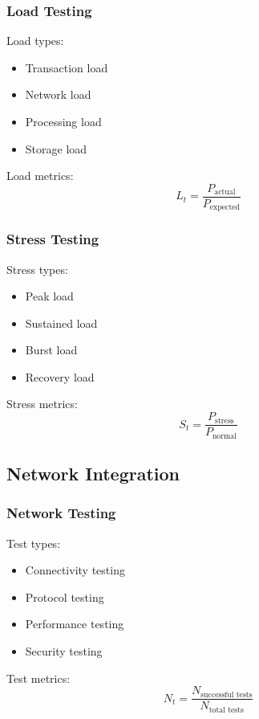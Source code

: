 \documentclass[12pt]{article}
\begin{document}
\subsubsection{Load Testing}

Load types:
\begin{itemize}
\item Transaction load
\item Network load
\item Processing load
\item Storage load
\end{itemize}

Load metrics:
\begin{equation}
L_t = \frac{P_{\text{actual}}}{P_{\text{expected}}}
\end{equation}

\subsubsection{Stress Testing}

Stress types:
\begin{itemize}
\item Peak load
\item Sustained load
\item Burst load
\item Recovery load
\end{itemize}

Stress metrics:
\begin{equation}
S_t = \frac{P_{\text{stress}}}{P_{\text{normal}}}
\end{equation}

\subsection{Network Integration}

\subsubsection{Network Testing}

Test types:
\begin{itemize}
\item Connectivity testing
\item Protocol testing
\item Performance testing
\item Security testing
\end{itemize}

Test metrics:
\begin{equation}
N_t = \frac{N_{\text{successful tests}}}{N_{\text{total tests}}}
\end{equation}
\end{document}
